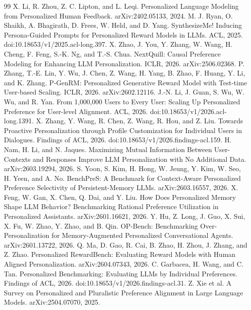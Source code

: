 \documentclass[10pt]{article}
\begin{document}
\begin{thebibliography}{99}
 X. Li, R. Zhou, Z. C. Lipton, and L. Leqi. Personalized Language Modeling from Personalized Human Feedback. arXiv:2402.05133, 2024.
 M. J. Ryan, O. Shaikh, A. Bhagirath, D. Frees, W. Held, and D. Yang. SynthesizeMe! Inducing Persona-Guided Prompts for Personalized Reward Models in LLMs. ACL, 2025. doi:10.18653/v1/2025.acl-long.397.
 X. Zhao, J. You, Y. Zhang, W. Wang, H. Cheng, F. Feng, S.-K. Ng, and T.-S. Chua. NextQuill: Causal Preference Modeling for Enhancing LLM Personalization. ICLR, 2026. arXiv:2506.02368.
 P. Zhang, T.-E. Lin, Y. Wu, J. Chen, Z. Wang, H. Yang, B. Zhao, F. Huang, Y. Li, and K. Zhang. P-GenRM: Personalized Generative Reward Model with Test-time User-based Scaling. ICLR, 2026. arXiv:2602.12116.
 J.-N. Li, J. Guan, S. Wu, W. Wu, and R. Yan. From 1,000,000 Users to Every User: Scaling Up Personalized Preference for User-level Alignment. ACL, 2026. doi:10.18653/v1/2026.acl-long.1391.
 X. Zhang, Y. Wang, R. Chen, Z. Wang, R. Hou, and Z. Liu. Towards Proactive Personalization through Profile Customization for Individual Users in Dialogues. Findings of ACL, 2026. doi:10.18653/v1/2026.findings-acl.159.
 H. Nam, H. Li, and N. Jaques. Maximizing Mutual Information Between User-Contexts and Responses Improve LLM Personalization with No Additional Data. arXiv:2603.19294, 2026.
 S. Yoon, S. Kim, H. Hong, W. Jeung, Y. Kim, W. Seo, H. Yeen, and A. No. BenchPreS: A Benchmark for Context-Aware Personalized Preference Selectivity of Persistent-Memory LLMs. arXiv:2603.16557, 2026.
 X. Feng, W. Gan, X. Chen, Q. Dai, and Y. Liu. How Does Personalized Memory Shape LLM Behavior? Benchmarking Rational Preference Utilization in Personalized Assistants. arXiv:2601.16621, 2026.
 Y. Hu, Z. Long, J. Guo, X. Sui, X. Fu, W. Zhao, Y. Zhao, and B. Qin. OP-Bench: Benchmarking Over-Personalization for Memory-Augmented Personalized Conversational Agents. arXiv:2601.13722, 2026.
 Q. Ma, D. Gao, R. Cai, B. Zhao, H. Zhou, J. Zhang, and Z. Zhao. Personalized RewardBench: Evaluating Reward Models with Human Aligned Personalization. arXiv:2604.07343, 2026.
 C. Garbacea, H. Wang, and C. Tan. Personalized Benchmarking: Evaluating LLMs by Individual Preferences. Findings of ACL, 2026. doi:10.18653/v1/2026.findings-acl.31.
 Z. Xie et al. A Survey on Personalized and Pluralistic Preference Alignment in Large Language Models. arXiv:2504.07070, 2025.

\end{thebibliography}
\end{document}
